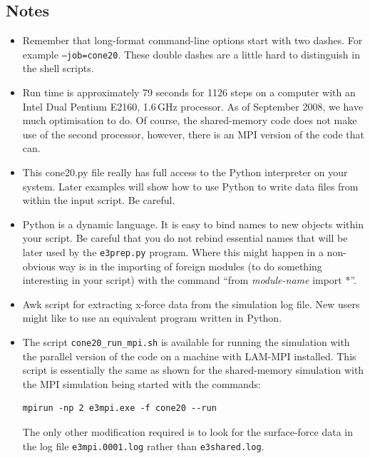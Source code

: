 \noindent
\topbar

\bottombar

\subsection{Notes}
\begin{itemize}
\item Remember that long-format command-line options start with two dashes.
      For example \texttt{--job=cone20}.
      These double dashes are a little hard to distinguish in the shell
      scripts.

\item Run time is approximately 79 seconds for 1126 steps on a computer with 
      an Intel Dual Pentium E2160, 1.6\,GHz processor.
      As of September 2008, we have much optimisation to do.
      Of course, the shared-memory code does not make use of the second processor,
      however, there is an MPI version of the code that can.

\item This cone20.py file really has full access to the Python interpreter
      on your system.  Later examples will show how to use Python to write
      data files from within the input script.  Be careful.

\item Python is a dynamic language.
      It is easy to bind names to new objects within your script.
      Be careful that you do not rebind essential names that will be
      later used by the \texttt{e3prep.py} program.
      Where this might happen in a non-obvious way is in the importing
      of foreign modules (to do something interesting in your script)
      with the command ``from \textit{module-name} import *''.

\item Awk script for extracting x-force data from the simulation log file.
      New users might like to use an equivalent program written in Python.

\item The script \texttt{cone20\_run\_mpi.sh} is available for running the simulation
  with the parallel version of the code on a machine with LAM-MPI installed.
  This script is essentially the same as shown for the shared-memory simulation
  with the MPI simulation being started with the commands:
\begin{verbatim}
mpirun -np 2 e3mpi.exe -f cone20 --run
\end{verbatim}
  The only other modification required is to look for the surface-force data in the
  log file \texttt{e3mpi.0001.log} rather than \texttt{e3shared.log}.


\end{itemize}
